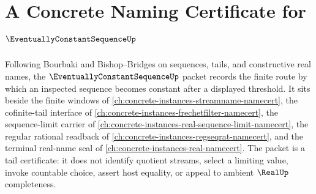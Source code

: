 \chapter{A Concrete Naming Certificate for $\EventuallyConstantSequenceUp$}
\label{ch:concrete-instances-eventually-constant-sequence-namecert}

Following Bourbaki and Bishop--Bridges on sequences, tails, and constructive real names, the $\EventuallyConstantSequenceUp$ packet records the finite route by which an inspected sequence becomes constant after a displayed threshold. It sits beside the finite windows of \autoref{ch:concrete-instances-streamname-namecert}, the cofinite-tail interface of \autoref{ch:concrete-instances-frechetfilter-namecert}, the sequence-limit carrier of \autoref{ch:concrete-instances-real-sequence-limit-namecert}, the regular rational readback of \autoref{ch:concrete-instances-regseqrat-namecert}, and the terminal real-name seal of \autoref{ch:concrete-instances-real-namecert}. The packet is a tail certificate: it does not identify quotient streams, select a limiting value, invoke countable choice, assert host equality, or appeal to ambient $\RealUp$ completeness.

